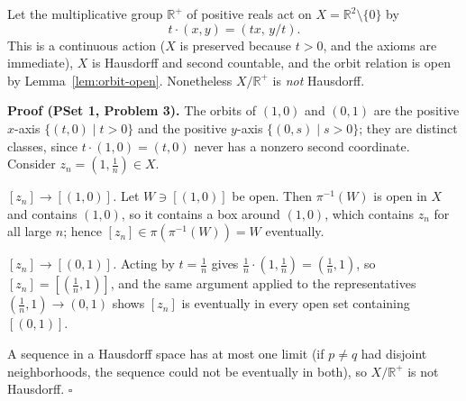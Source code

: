 \documentclass[11pt]{report}
\makeatletter
\newcounter{excounter}[section]
\renewenvironment{proof}[1][Proof]{\noindent\textbf{#1.} }{\hfill$\square$\par\vspace{5pt}}
\newcommand{\exlabel}[1]{\edef\@currentlabel{\arabic{section}.\arabic{excounter}}\label{#1}}
\newcommand{\leeref}[1]{\par\smallskip{\raggedleft\footnotesize\textsc{Lee}:\ #1\par}}
\makeatother
\begin{document}
\begin{exbox}\exlabel{ex:nonhausdorff-orbit}
Let the multiplicative group $\mathbb{R}^{+}$ of positive reals act on $X = \mathbb{R}^2 \setminus \{0\}$ by
\[
t \cdot (x, y) = (tx,\, y/t).
\]
This is a continuous action ($X$ is preserved because $t > 0$, and the axioms are immediate), $X$ is Hausdorff and second countable, and the orbit relation is open by Lemma~\ref{lem:orbit-open}. Nonetheless $X/\mathbb{R}^{+}$ is \emph{not} Hausdorff.
\leeref{cf.\ Example 21.3}
\end{exbox}
\begin{center}
\end{center}


\begin{proof}[Proof (PSet 1, Problem 3)]
The orbits of $(1,0)$ and $(0,1)$ are the positive $x$-axis $\{(t,0) \mid t>0\}$ and the positive $y$-axis $\{(0,s) \mid s>0\}$; they are distinct classes, since $t \cdot (1,0) = (t,0)$ never has a nonzero second coordinate. Consider $z_n = (1, \tfrac1n) \in X$.

\emph{$[z_n] \to [(1,0)]$.} Let $W \ni [(1,0)]$ be open. Then $\pi^{-1}(W)$ is open in $X$ and contains $(1,0)$, so it contains a box around $(1,0)$, which contains $z_n$ for all large $n$; hence $[z_n] \in \pi(\pi^{-1}(W)) = W$ eventually.

\emph{$[z_n] \to [(0,1)]$.} Acting by $t = \tfrac1n$ gives $\tfrac1n \cdot (1, \tfrac1n) = (\tfrac1n, 1)$, so $[z_n] = [(\tfrac1n, 1)]$, and the same argument applied to the representatives $(\tfrac1n, 1) \to (0,1)$ shows $[z_n]$ is eventually in every open set containing $[(0,1)]$.

A sequence in a Hausdorff space has at most one limit (if $p \neq q$ had disjoint neighborhoods, the sequence could not be eventually in both), so $X/\mathbb{R}^{+}$ is not Hausdorff.
\end{proof}
\end{document}
